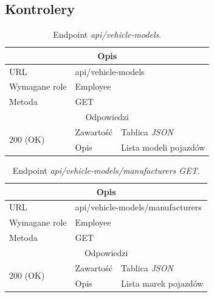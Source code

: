 \documentclass[eng,printmode,openany]{mgr}
\begin{document}
	\subsection{Kontrolery}
	
	\begin{table}[H]
		\caption{Endpoint \textit{api/vehicle-models}.}
		\begin{tabularx}{\textwidth}{|l|l|X|}
			\hline
			\multicolumn{3}{|c|}{Opis}
			\\ \hline
			URL                         & \multicolumn{2}{l|}{api/vehicle-models}
			\\ \hline
			Wymagane role               & \multicolumn{2}{l|}{Employee}
			\\ \hline
			Metoda                      & \multicolumn{2}{l|}{GET}
			\\ \hline
			\multicolumn{3}{|c|}{ Odpowiedzi}
			\\ \hline
			\multirow{2}{*}{200 (OK)}   & Zawartość         & Tablica \textit{JSON}
			\\ \cline{2-3}              & Opis         	    & Lista modeli pojazdów
			\\ \hline
		\end{tabularx}
	\end{table}
	
	\begin{table}[H]
		\caption{Endpoint \textit{api/vehicle-models/manufacturers GET}.}
		\begin{tabularx}{\textwidth}{|l|l|X|}
			\hline
			\multicolumn{3}{|c|}{Opis}
			
			\\ \hline
			URL                         & \multicolumn{2}{l|}{api/vehicle-models/manufacturers}
			\\ \hline
			Wymagane role               & \multicolumn{2}{l|}{Employee}
			\\ \hline
			Metoda                      & \multicolumn{2}{l|}{GET}
			\\ \hline
			\multicolumn{3}{|c|}{Odpowiedzi}
			\\ \hline
			\multirow{2}{*}{200 (OK)}   & Zawartość        & Tablica \textit{JSON}
			\\ \cline{2-3}              & Opis         	   & Lista marek pojazdów
			\\ \hline
		\end{tabularx}
	\end{table}
	
\end{document}
